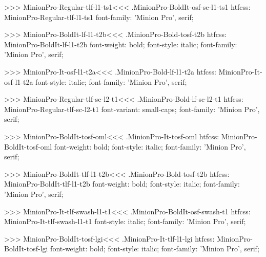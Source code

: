 {>>>
\<MinionPro-Regular-tlf-l1-ts1\><<<
.MinionPro-BoldIt-osf-sc-l1-ts1
htfcss:  MinionPro-Regular-tlf-l1-ts1  font-family: 'Minion Pro', serif;

>>>
\<MinionPro-BoldIt-lf-l1-t2b\><<<
.MinionPro-Bold-tosf-t2b
htfcss:  MinionPro-BoldIt-lf-l1-t2b  font-weight: bold; font-style: italic; font-family: 'Minion Pro', serif;

>>>
\<MinionPro-It-osf-l1-t2a\><<<
.MinionPro-Bold-lf-l1-t2a
htfcss:  MinionPro-It-osf-l1-t2a  font-style: italic; font-family: 'Minion Pro', serif;

>>>
\<MinionPro-Regular-tlf-sc-l2-t1\><<<
.MinionPro-Bold-lf-sc-l2-t1
htfcss:  MinionPro-Regular-tlf-sc-l2-t1  font-variant: small-caps; font-family: 'Minion Pro', serif;

>>>
\<MinionPro-BoldIt-tosf-oml\><<<
.MinionPro-It-tosf-oml
htfcss:  MinionPro-BoldIt-tosf-oml  font-weight: bold; font-style: italic; font-family: 'Minion Pro', serif;

>>>
\<MinionPro-BoldIt-tlf-l1-t2b\><<<
.MinionPro-Bold-tosf-t2b
htfcss:  MinionPro-BoldIt-tlf-l1-t2b  font-weight: bold; font-style: italic; font-family: 'Minion Pro', serif;

>>>
\<MinionPro-It-tlf-swash-l1-t1\><<<
.MinionPro-BoldIt-osf-swash-t1
htfcss:  MinionPro-It-tlf-swash-l1-t1  font-style: italic; font-family: 'Minion Pro', serif;

>>>
\<MinionPro-BoldIt-tosf-lgi\><<<
.MinionPro-It-tlf-l1-lgi
htfcss:  MinionPro-BoldIt-tosf-lgi  font-weight: bold; font-style: italic; font-family: 'Minion Pro', serif;

}

